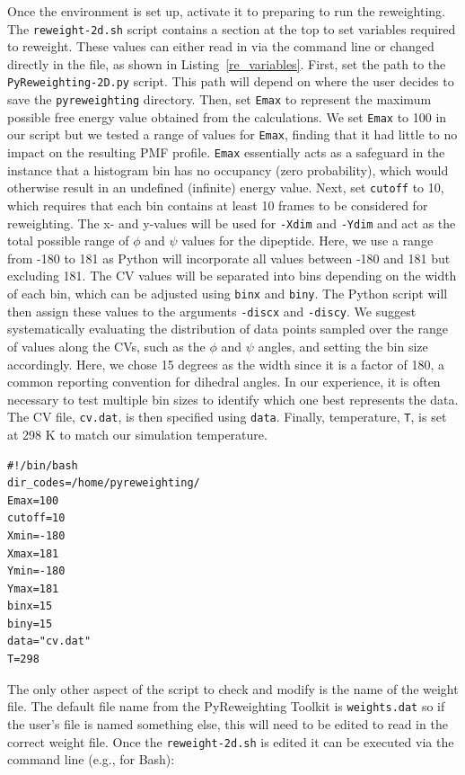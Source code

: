 \documentclass[9pt,tutorial]{livecoms}
\begin{document}
Once the environment is set up, activate it to preparing to run the reweighting. The \texttt{reweight-2d.sh} script contains a section at the top to set variables required to reweight. These values can either read in via the command line or changed directly in the file, as shown in Listing~\ref{re_variables}. First, set the path to the \texttt{PyReweighting-2D.py} script. This path will depend on where the user decides to save the \texttt{pyreweighting} directory. Then, set \texttt{Emax} to represent the maximum possible free energy value obtained from the calculations. We set \texttt{Emax} to 100 in our script but we tested a range of values for \texttt{Emax}, finding that it had little to no impact on the resulting PMF profile. \texttt{Emax} essentially acts as a safeguard in the instance that a histogram bin has no occupancy (zero probability), which would otherwise result in an undefined (infinite) energy value. Next, set \texttt{cutoff} to 10, which requires that each bin contains at least 10 frames to be considered for reweighting. The x- and y-values will be used for \texttt{-Xdim} and \texttt{-Ydim} and act as the total possible range of $\phi$ and $\psi$ values for the dipeptide. Here, we use a range from -180 to 181 as Python will incorporate all values between -180 and 181 but excluding 181. The CV values will be separated into bins depending on the width of each bin, which can be adjusted using \texttt{binx} and \texttt{biny}. The Python script will then assign these values to the arguments \texttt{-discx} and \texttt{-discy}. We suggest systematically evaluating the distribution of data points sampled over the range of values along the CVs, such as the $\phi$ and $\psi$ angles, and setting the bin size accordingly. Here, we chose 15 degrees as the width since it is a factor of 180, a common reporting convention for dihedral angles. In our experience, it is often necessary to test multiple bin sizes to identify which one best represents the data. The CV file, \texttt{cv.dat}, is then specified using \texttt{data}. Finally, temperature, \texttt{T}, is set at 298 K to match our simulation temperature. 


\bigskip
\begin{lstlisting}[label=re_variables, caption=Reweight-2d.sh, basicstyle=\small, backgroundcolor=\color{light-gray}]
#!/bin/bash
dir_codes=/home/pyreweighting/
Emax=100
cutoff=10
Xmin=-180
Xmax=181
Ymin=-180
Ymax=181
binx=15
biny=15
data="cv.dat"
T=298
\end{lstlisting}

The only other aspect of the script to check and modify is the name of the weight file. The default file name from the PyReweighting Toolkit is \texttt{weights.dat} so if the user's file is named something else, this will need to be edited to read in the correct weight file. Once the \texttt{reweight-2d.sh} is edited it can be executed via the command line (e.g., for Bash):
\end{document}
